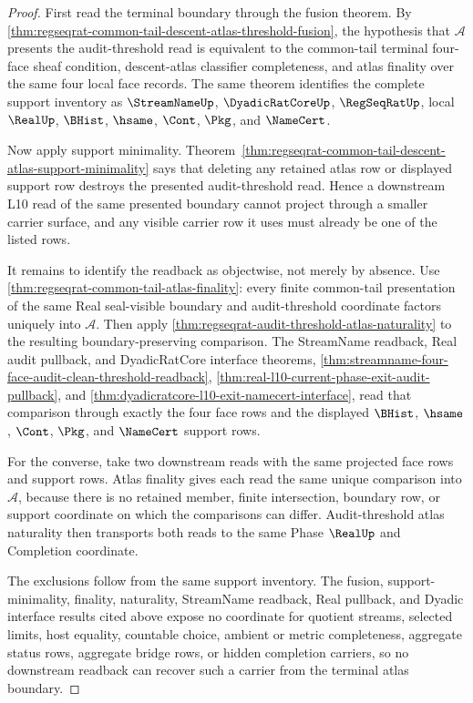 \begin{proof}
First read the terminal boundary through the fusion theorem. By \autoref{thm:regseqrat-common-tail-descent-atlas-threshold-fusion}, the hypothesis that $\mathcal A$ presents the audit-threshold read is equivalent to the common-tail terminal four-face sheaf condition, descent-atlas classifier completeness, and atlas finality over the same four local face records. The same theorem identifies the complete support inventory as $\StreamNameUp$, $\DyadicRatCoreUp$, $\RegSeqRatUp$, local $\RealUp$, $\BHist$, $\hsame$, $\Cont$, $\Pkg$, and $\NameCert$.

Now apply support minimality. Theorem~\ref{thm:regseqrat-common-tail-descent-atlas-support-minimality} says that deleting any retained atlas row or displayed support row destroys the presented audit-threshold read. Hence a downstream L10 read of the same presented boundary cannot project through a smaller carrier surface, and any visible carrier row it uses must already be one of the listed rows.

It remains to identify the readback as objectwise, not merely by absence. Use \autoref{thm:regseqrat-common-tail-atlas-finality}: every finite common-tail presentation of the same Real seal-visible boundary and audit-threshold coordinate factors uniquely into $\mathcal A$. Then apply \autoref{thm:regseqrat-audit-threshold-atlas-naturality} to the resulting boundary-preserving comparison. The StreamName readback, Real audit pullback, and DyadicRatCore interface theorems, \autoref{thm:streamname-four-face-audit-clean-threshold-readback}, \autoref{thm:real-l10-current-phase-exit-audit-pullback}, and \autoref{thm:dyadicratcore-l10-exit-namecert-interface}, read that comparison through exactly the four face rows and the displayed $\BHist$, $\hsame$, $\Cont$, $\Pkg$, and $\NameCert$ support rows.

For the converse, take two downstream reads with the same projected face rows and support rows. Atlas finality gives each read the same unique comparison into $\mathcal A$, because there is no retained member, finite intersection, boundary row, or support coordinate on which the comparisons can differ. Audit-threshold atlas naturality then transports both reads to the same Phase $\RealUp$ and Completion coordinate.

The exclusions follow from the same support inventory. The fusion, support-minimality, finality, naturality, StreamName readback, Real pullback, and Dyadic interface results cited above expose no coordinate for quotient streams, selected limits, host equality, countable choice, ambient or metric completeness, aggregate status rows, aggregate bridge rows, or hidden completion carriers, so no downstream readback can recover such a carrier from the terminal atlas boundary.
\end{proof}
